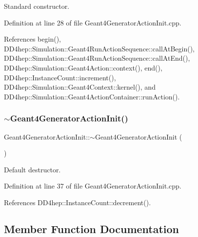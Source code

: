 Standard constructor. 



Definition at line 28 of file Geant4\+Generator\+Action\+Init.\+cpp.



References begin(), D\+D4hep\+::\+Simulation\+::\+Geant4\+Run\+Action\+Sequence\+::call\+At\+Begin(), D\+D4hep\+::\+Simulation\+::\+Geant4\+Run\+Action\+Sequence\+::call\+At\+End(), D\+D4hep\+::\+Simulation\+::\+Geant4\+Action\+::context(), end(), D\+D4hep\+::\+Instance\+Count\+::increment(), D\+D4hep\+::\+Simulation\+::\+Geant4\+Context\+::kernel(), and D\+D4hep\+::\+Simulation\+::\+Geant4\+Action\+Container\+::run\+Action().

\hypertarget{class_d_d4hep_1_1_simulation_1_1_geant4_generator_action_init_a8e406b069d1024eb9891cbb979c5a734}{}\label{class_d_d4hep_1_1_simulation_1_1_geant4_generator_action_init_a8e406b069d1024eb9891cbb979c5a734} 
\subsubsection{\texorpdfstring{$\sim$\+Geant4\+Generator\+Action\+Init()}{~Geant4GeneratorActionInit()}}
{\footnotesize\ttfamily Geant4\+Generator\+Action\+Init\+::$\sim$\+Geant4\+Generator\+Action\+Init (\begin{DoxyParamCaption}{ }\end{DoxyParamCaption})\hspace{0.3cm}{\ttfamily [virtual]}}



Default destructor. 



Definition at line 37 of file Geant4\+Generator\+Action\+Init.\+cpp.



References D\+D4hep\+::\+Instance\+Count\+::decrement().



\subsection{Member Function Documentation}
\hypertarget{class_d_d4hep_1_1_simulation_1_1_geant4_generator_action_init_a7f4d99a8f94977444775eabea8080868}{}\label{class_d_d4hep_1_1_simulation_1_1_geant4_generator_action_init_a7f4d99a8f94977444775eabea8080868} 
